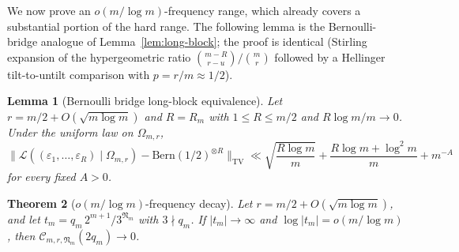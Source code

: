 \documentclass[11pt,a4paper]{amsart}
\theoremstyle{plain}
\newtheorem{theorem}{Theorem}[section]
\newtheorem{lemma}[theorem]{Lemma}
\theoremstyle{definition}
\newcommand{\TV}{\mathrm{TV}}
\begin{document}
We now prove an $o(m/\log m)$-frequency range, which already covers a
substantial portion of the hard range.
The following lemma is the Bernoulli-bridge analogue of
Lemma~\ref{lem:long-block}; the proof is identical (Stirling expansion of the
hypergeometric ratio $\binom{m-R}{r-u}/\binom{m}{r}$ followed by a
Hellinger tilt-to-untilt comparison with $p=r/m\approx 1/2$).

\begin{lemma}[Bernoulli bridge long-block equivalence]
\label{lem:bernoulli-bridge-long-block}
Let $r=m/2+O(\sqrt{m\log m})$ and $R=R_m$ with $1\le R\le m/2$ and
$R\log m/m\to 0$.
Under the uniform law on $\Omega_{m,r}$,
$$
\bigl\|\mathcal L((\varepsilon_1,\dots,\varepsilon_R)\mid\Omega_{m,r})
-\mathrm{Bern}(1/2)^{\otimes R}\bigr\|_{\TV}
\ll\sqrt{\frac{R\log m}{m}}+\frac{R\log m+\log^2 m}{m}+m^{-A}
$$
for every fixed $A>0$.
\end{lemma}

\begin{theorem}[$o(m/\log m)$-frequency decay]\label{thm:P}
Let $r=m/2+O(\sqrt{m\log m})$, and let $t_m=q_m\,2^{m+1}/3^{\mathfrak N_m}$ with
$3\nmid q_m$.
If $|t_m|\to\infty$ and $\log|t_m|=o(m/\log m)$, then
$\mathcal C_{m,r,\mathfrak N_m}(2q_m)\to0$.
\end{theorem}
\end{document}
